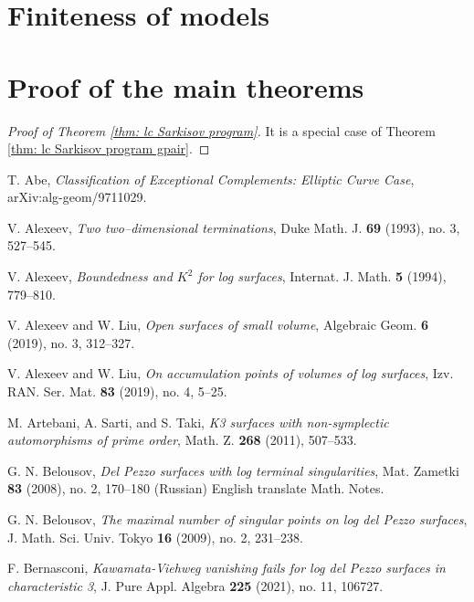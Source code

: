 \documentclass[11pt]{amsart}
\numberwithin{equation}{section}
\theoremstyle{definition}
\theoremstyle{definition}
\theoremstyle{definition}
\begin{document}
\section{Finiteness of models}

\section{Proof of the main theorems}

\begin{proof}[Proof of Theorem \ref{thm: lc Sarkisov program}]
    It is a special case of Theorem \ref{thm: lc Sarkisov program gpair}.
\end{proof}






\begin{thebibliography}{ABCDE}

 T. Abe, \textit{Classification of Exceptional Complements: Elliptic Curve Case}, arXiv:alg-geom/9711029.

 V. Alexeev, \textit{Two two--dimensional terminations}, Duke Math. J. \textbf{69} (1993), no. 3, 527--545.

 V. Alexeev, \textit{Boundedness and $K^2$ for log surfaces}, Internat. J. Math. \textbf{5} (1994), 779--810.

 V. Alexeev and W. Liu, \textit{Open surfaces of small volume}, Algebraic Geom. \textbf{6} (2019), no. 3, 312--327.

 V. Alexeev and W. Liu, \textit{On accumulation points of volumes of log surfaces}, Izv. RAN. Ser. Mat. \textbf{83} (2019), no. 4, 5--25.

 M. Artebani, A. Sarti, and S. Taki, \textit{K3 surfaces with non-symplectic automorphisms of prime order}, Math. Z. \textbf{268} (2011), 507--533.

 G. N. Belousov, \textit{Del Pezzo surfaces with log terminal singularities}, Mat. Zametki \textbf{83} (2008), no. 2, 170--180 (Russian) English translate Math. Notes.

 G. N. Belousov, \textit{The maximal number of singular points on log del Pezzo surfaces}, J. Math. Sci. Univ. Tokyo \textbf{16} (2009), no. 2, 231--238.

 F. Bernasconi, \textit{Kawamata-Viehweg vanishing fails for log del Pezzo surfaces in characteristic 3}, J. Pure Appl. Algebra \textbf{225} (2021), no. 11, 106727.


\end{thebibliography}
\end{document}
